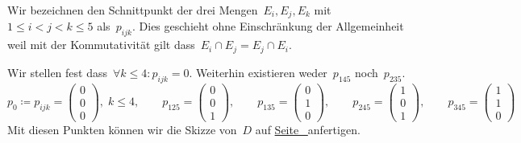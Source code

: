 \documentclass[../full]{subfiles}
\begin{document}
    Wir bezeichnen den Schnittpunkt der drei Mengen~\( E_i, E_j, E_k \)
    mit~\( 1 \leq i < j < k \leq 5 \) als~\( p_{ijk} \).
    Dies geschieht ohne Einschr\"ankung der Allgemeinheit
    weil mit der Kommutativit\"at gilt dass~\( E_i \cap E_j = E_j \cap E_i \).

    Wir stellen fest dass~\( \forall k \leq 4 \colon p_{ijk} = 0 \).
    Weiterhin existieren weder~\( p_{145} \) noch~\( p_{235} \).
    \begin{equation*}
        p_0 \coloneqq
        p_{ijk} = \begin{pmatrix} 0 \\ 0 \\ 0 \end{pmatrix},
        \; k \leq 4,
        \qquad
        p_{125} = \begin{pmatrix} 0 \\ 0 \\ 1 \end{pmatrix},
        \qquad
        p_{135} = \begin{pmatrix} 0 \\ 1 \\ 0 \end{pmatrix},
        \qquad
        p_{245} = \begin{pmatrix} 1 \\ 0 \\ 1 \end{pmatrix},
        \qquad
        p_{345} = \begin{pmatrix} 1 \\ 1 \\ 0 \end{pmatrix}
    \end{equation*}
    Mit diesen Punkten k\"onnen wir die Skizze von~\( D \)
    auf \hyperref[task:3dint:generic:sketch:visual]{%
        Seite~\pageref*{task:3dint:generic:sketch:visual}%
    } anfertigen.


\end{document}
